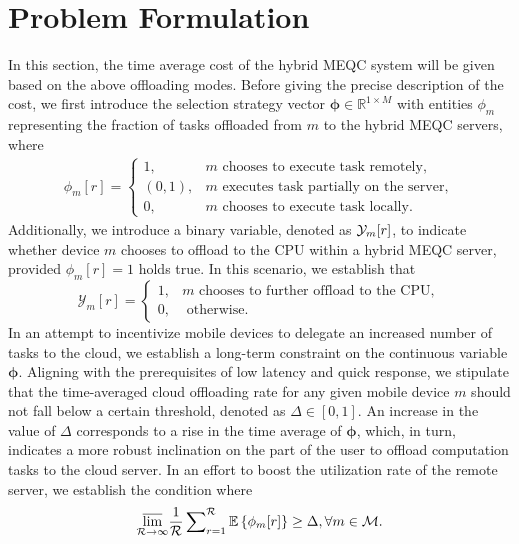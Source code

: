 \documentclass[journal]{IEEEtran}
\begin{document}
\section{Problem Formulation}
In this section, the time average cost of the hybrid MEQC system will be given based on the above offloading modes.
Before giving the precise description of the cost, we first introduce the selection strategy vector ${\pmb\phi}\in {\mathbb R}^{1\times M}$ with entities $\phi_m$ representing the fraction of tasks offloaded from $m$ to the hybrid MEQC servers, where
\begin{align}\label{eq:8}
\mathcal{\phi}_{m}[r]=\begin{cases}
1, &m\text{~chooses to execute task remotely}, \\
(0,1), &m\text{~executes task partially on the server},\\
0, &m\text{~chooses to execute task locally}.
\end{cases}
\end{align}
Additionally, we introduce a binary variable, denoted as ${\cal Y}_m[r]$, to indicate whether device $m$ chooses to offload to the CPU within a hybrid MEQC server, provided $\phi_m[r]=1$ holds true.
In this scenario, we establish that
\begin{equation}\label{eq:9}
\mathcal{Y}_{m}[r]=\begin{cases}
1, & m \text{ chooses to further offload to the CPU}, \\
0, & \text{ otherwise.}
\end{cases}
\end{equation}
In an attempt to incentivize mobile devices to delegate an increased number of tasks to the cloud, we establish a long-term constraint on the continuous variable $\pmb\phi$.
Aligning with the prerequisites of low latency and quick response, we stipulate that the time-averaged cloud offloading rate for any given mobile device $m$ should not fall below a certain threshold, denoted as $\Delta\in[0,1]$.
An increase in the value of $\Delta$ corresponds to a rise in the time average of $\pmb\phi$, which, in turn, indicates a more robust inclination on the part of the user to offload computation tasks to the cloud server.
In an effort to boost the utilization rate of the remote server, we establish the condition where
\begin{equation}\label{eq:99}
    {\varlimsup_{\cal R \to \infty} } \frac{1}{\cal R}\sum\nolimits_{r=1}^{\cal R}\mathbb{E}\left\{\phi_m[r] \right\}\ge \Delta,\forall m \in \mathcal{M}.
\end{equation}
\end{document}
